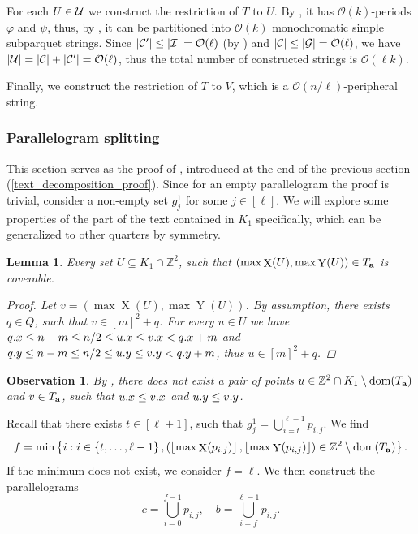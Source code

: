 \documentclass[11pt]{article}
\newcommand{\Z}{\mathbb{Z}}
\renewcommand{\O}{\mathcal{O}}
\renewcommand{\phi}{\varphi}
\newcommand{\set}[1]{\left\lbrace #1 \right\rbrace}
\newcommand{\floor}[1]{\left\lfloor #1 \right\rfloor}
\theoremstyle{plain}
\newtheorem{lemma}{Lemma}
\newtheorem{observation}{Observation}
\theoremstyle{definition}
\theoremstyle{remark}
\DeclareMathOperator*{\X}{X}
\DeclareMathOperator*{\Y}{Y}
\begin{document}
For each $U \in \mathcal{U}$ we construct the restriction of $T$ to $U$.
By , it has $\O(k)$-periods $\phi$ and $\psi$, thus, by , it can be partitioned into $\O(k)$ monochromatic simple subparquet strings.
Since $|\C'| \le |\I| = \O(\ell)$ (by ) and $|\C| \le |\G| = \O(\ell)$, we have $|\U| = |\C| + |\C'| = \O(\ell)$, thus the total number of constructed strings is $\O(\ell k)$.

Finally, we construct the restriction of $T$ to $V$, which is a $\O(n / \ell)$-peripheral string.


\subsubsection{Parallelogram splitting} \label{parallelogram_split_lemma_proof}

This section serves as the proof of , introduced at the end of the previous section (\ref{text_decomposition_proof}).
Since for an empty parallelogram the proof is trivial, consider a non-empty set $g^1_j$ for some $j \in [\ell]$.
We will explore some properties of the part of the text contained in $K_1$ specifically, which can be generalized to other quarters by symmetry.

\begin{lemma}\label{coverability_condition}
	Every set $U \subseteq K_1 \cap \Z^2$, such that $(\max \X(U), \max \Y(U)) \in \Ta$ is coverable.
	\begin{proof}
		Let $v = (\max \X(U), \max \Y(U))$.
		By assumption, there exists $q \in Q$, such that $v \in [m]^2 + q$.
		For every $u \in U$ we have
		$q.x \le n - m \le n / 2 \le u.x \le v.x < q.x + m$
		and $q.y \le n - m \le n / 2 \le u.y \le v.y < q.y + m$,
		thus $u \in [m]^2 + q$.
	\end{proof}
\end{lemma}

\begin{observation}\label{domination_lemma}
	By , there does not exist a pair of points $u \in \Z^2 \cap K_1 \setminus \d{\Ta}$ and $v \in T_\mathbf{a}$, such that $u.x \le v.x$ and $u.y \le v.y$. 
\end{observation}

Recall that there exists $t \in [\ell + 1]$, such that
$ g^1_j = \bigcup_{i = t}^{\ell - 1} p_{i, j}.$
We find 
\[ f = \min\set{i : i \in \set{t, \dots, \ell - 1}, (\floor{\max \X(p_{i, j})}, \floor{\max \Y(p_{i, j})}) \in \Z^2 \setminus \d{\Ta}}.\]
If the minimum does not exist, we consider $f = \ell$.
We then construct the parallelograms
\[c = \bigcup_{i = 0}^{f - 1} p_{i, j}, \quad b = \bigcup_{i = f}^{\ell - 1} p_{i, j}.\]
\end{document}
